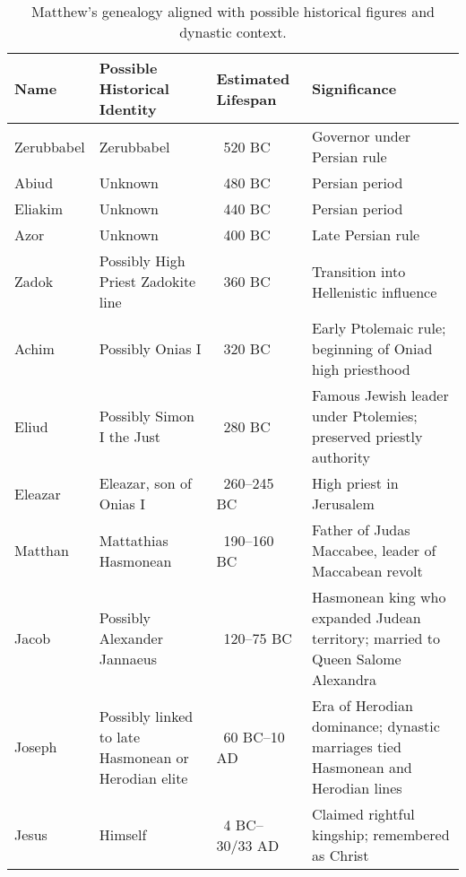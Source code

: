 \begin{table}[h]
    \centering
    \begin{tabular}{|l|p{3cm}|p{2.5cm}|p{4.5cm}|}
        \hline
        \textbf{Name} & \textbf{Possible Historical Identity} & \textbf{Estimated Lifespan} & \textbf{Significance} \\ \hline
        Zerubbabel & Zerubbabel & ~520 BC & Governor under Persian rule \\ \hline
        Abiud & Unknown & ~480 BC & Persian period \\ \hline
        Eliakim & Unknown & ~440 BC & Persian period \\ \hline
        Azor & Unknown & ~400 BC & Late Persian rule \\ \hline
        Zadok & Possibly High Priest Zadokite line & ~360 BC & Transition into Hellenistic influence \\ \hline
        Achim & Possibly Onias I & ~320 BC & Early Ptolemaic rule; beginning of Oniad high priesthood \\ \hline
        Eliud & Possibly Simon I the Just & ~280 BC & Famous Jewish leader under Ptolemies; preserved priestly authority \\ \hline
        Eleazar & Eleazar, son of Onias I & ~260–245 BC & High priest in Jerusalem \\ \hline
        Matthan & Mattathias Hasmonean & ~190–160 BC & Father of Judas Maccabee, leader of Maccabean revolt \\ \hline
        Jacob & Possibly Alexander Jannaeus & ~120–75 BC & Hasmonean king who expanded Judean territory; married to Queen Salome Alexandra \\ \hline
        Joseph & Possibly linked to late Hasmonean or Herodian elite & ~60 BC–10 AD & Era of Herodian dominance; dynastic marriages tied Hasmonean and Herodian lines \\ \hline
        Jesus & Himself & ~4 BC–30/33 AD & Claimed rightful kingship; remembered as Christ \\ \hline
    \end{tabular}
    \caption{Matthew’s genealogy aligned with possible historical figures and dynastic context.}\label{tab:table}
\end{table}

